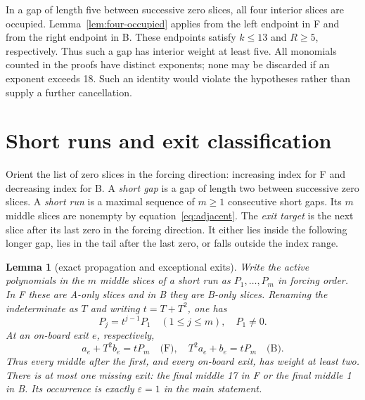 \documentclass{article}
\newtheorem{lemma}{Lemma}
\begin{document}
In a gap of length five between successive zero slices, all four interior slices are
occupied. Lemma~\ref{lem:four-occupied} applies from the left endpoint in F and from the right
endpoint in B. These endpoints satisfy \(k \le 13\) and \(R \ge 5\), respectively. Thus such a
gap has interior weight at least five. All monomials counted in the proofs have distinct
exponents; none may be discarded if an exponent exceeds 18. Such an identity would violate
the hypotheses rather than supply a further cancellation.

\section{Short runs and exit classification}\label{sec:short-runs}

Orient the list of zero slices in the forcing direction: increasing index for F and
decreasing index for B. A \emph{short gap} is a gap of length two between successive zero
slices. A \emph{short run} is a maximal sequence of \(m \ge 1\) consecutive short gaps. Its
\(m\) middle slices are nonempty by equation~\eqref{eq:adjacent}. The \emph{exit target} is
the next slice after its last zero in the forcing direction. It either lies inside the
following longer gap, lies in the tail after the last zero, or falls outside the index range.

\begin{lemma}[exact propagation and exceptional exits]\label{lem:propagation}
  Write the active polynomials in the \(m\) middle slices of a short run as
  \(P_1, \dots, P_m\) in forcing order. In F these are A-only slices and in B they are B-only
  slices. Renaming the indeterminate as \(T\) and writing \(t = T + T^2\), one has
  \begin{equation}\label{eq:run-powers}
    P_j = t^{j-1} P_1 \quad (1 \le j \le m), \quad P_1 \ne 0.
  \end{equation}
  At an on-board exit \(e\), respectively,
  \begin{equation}\label{eq:exit-feed}
    a_e + T^2 b_e = t P_m \quad \text{(F)}, \quad
    T^2 a_e + b_e = t P_m \quad \text{(B)}.
  \end{equation}
  Thus every middle after the first, and every on-board exit, has weight at least two. There
  is at most one missing exit: the final middle 17 in F or the final middle 1 in B. Its
  occurrence is exactly \(\varepsilon = 1\) in the main statement.
\end{lemma}
\end{document}
